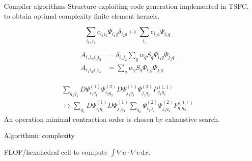 \documentclass[a0paper,portrait]{baposter}
\begin{document}
\begin{poster}
  \begin{posterbox}[name=rules, column=0, below=structure, span=3]{Compiler algorithms}
    Structure exploiting code generation implemented in TSFC, to obtain optimal complexity finite element kernels.
    \begin{tcbraster}[raster columns=6]
      \begin{tcolorbox}[raster multicolumn=3, title={Delta cancellation},left=0mm,right=0mm,top=0mm,bottom=0mm,boxsep=0.5mm,valign upper=center]
        \begin{equation*}
          \sum_{i_1, i_2} c_{i_1 i_2} \Psi_{i_1 q}
          \delta_{i_2 a} \mapsto \sum_{i_1} c_{i_1 a}\Psi_{i_1 q}
        \end{equation*}
      \end{tcolorbox}
      \begin{tcolorbox}[raster multicolumn=3, title={\dots across assignments},left=0mm,right=0mm,top=0mm,bottom=0mm,boxsep=0.5mm,valign upper=center]
        \begin{align*}
          A_{i_1 i_2 j_1 j_2} &= \delta_{i_2 j_2} \sum_q w_q S_q \Psi_{i_1 q}\Psi_{j_1 q} \\
          A_{i_1 i_2 j_1 i_2} &= \sum_q w_q S_q \Psi_{i_1 q}\Psi_{j_1 q}
        \end{align*}
      \end{tcolorbox}
      \begin{tcolorbox}[raster multicolumn=6, title={Sum factorisation},left=0mm,right=0mm,top=0mm,bottom=0mm,boxsep=0.5mm,valign upper=center, halign=center]
        \begin{align*}
          \sum_{q_1 q_2} D\Psi^{(1)}_{i_1 q_1}\Psi^{(2)}_{i_2 q_2} D\Psi^{(1)}_{j_1 q_1}\Psi^{(2)}_{j_2 q_2} P^{(1,1)}_{q_1 q_2} \\
          \mapsto \sum_{q_1} D\Psi^{(1)}_{i_1 q_1} D\Psi^{(1)}_{j_1 q_1} \sum_{q_2}  \Psi^{(2)}_{i_2 q_2}\Psi^{(2)}_{j_2 q_2} P^{(1,1)}_{q_1 q_2}
        \end{align*}
        An operation minimal contraction order is chosen by exhaustive search.
      \end{tcolorbox}
    \end{tcbraster}
  \end{posterbox}

  \begin{posterbox}[name=flop-scaling, column=3, below=introduction, span=3]{Algorithmic complexity}
    \begin{center}
      FLOP/hexahedral cell to compute $\int\!\nabla u \cdot \nabla v\,\text{d}x$.


\end{center}
\end{posterbox}
\end{poster}
\end{document}
